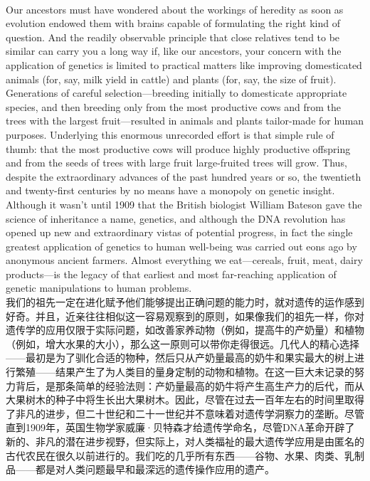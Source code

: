 \documentclass{article}
\begin{document}
\\
Our ancestors must have wondered about the workings of heredity as soon as evolution endowed them with brains capable of formulating the right kind of question. And the readily observable principle that close relatives tend to be similar can carry you a long way if, like our ancestors, your concern with the application of genetics is limited to practical matters like improving domesticated animals (for, say, milk yield in cattle) and plants (for, say, the size of fruit). Generations of careful selection—breeding initially to domesticate appropriate species, and then breeding only from the most productive cows and from the trees with the largest fruit—resulted in animals and plants tailor-made for human purposes. Underlying this enormous unrecorded effort is that simple rule of thumb: that the most productive cows will produce highly productive offspring and from the seeds of trees with large fruit large-fruited trees will grow. Thus, despite the extraordinary advances of the past hundred years or so, the twentieth and twenty-first centuries by no means have a monopoly on genetic insight. Although it wasn’t until 1909 that the British biologist William Bateson gave the science of inheritance a name, genetics, and although the DNA revolution has opened up new and extraordinary vistas of potential progress, in fact the single greatest application of genetics to human well-being was carried out eons ago by anonymous ancient farmers. Almost everything we eat—cereals, fruit, meat, dairy products—is the legacy of that earliest and most far-reaching application of genetic manipulations to human problems.\\
我们的祖先一定在进化赋予他们能够提出正确问题的能力时，就对遗传的运作感到好奇。并且，近亲往往相似这一容易观察到的原则，如果像我们的祖先一样，你对遗传学的应用仅限于实际问题，如改善家养动物（例如，提高牛的产奶量）和植物（例如，增大水果的大小），那么这一原则可以带你走得很远。几代人的精心选择——最初是为了驯化合适的物种，然后只从产奶量最高的奶牛和果实最大的树上进行繁殖——结果产生了为人类目的量身定制的动物和植物。在这一巨大未记录的努力背后，是那条简单的经验法则：产奶量最高的奶牛将产生高生产力的后代，而从大果树木的种子中将生长出大果树木。因此，尽管在过去一百年左右的时间里取得了非凡的进步，但二十世纪和二十一世纪并不意味着对遗传学洞察力的垄断。尽管直到1909年，英国生物学家威廉·贝特森才给遗传学命名，尽管DNA革命开辟了新的、非凡的潜在进步视野，但实际上，对人类福祉的最大遗传学应用是由匿名的古代农民在很久以前进行的。我们吃的几乎所有东西——谷物、水果、肉类、乳制品——都是对人类问题最早和最深远的遗传操作应用的遗产。\\
\end{document}
